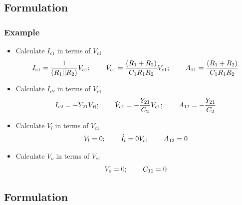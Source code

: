 \documentclass{beamer}
\begin{document}
\subsection*{Formulation}

\begin{frame}
\frametitle{Example}
\begin{small}
\begin{itemize}
\item Calculate $I_{c1}$ in terms of $V_{c1}$\\
\begin{equation}
I_{c1}=\frac{1}{(R_1||R_2)}V_{c1};\hspace{.3in} \dot{V}_{c1}=\frac{(R_1+R_2)}{C_1R_1R_2}V_{c1};\hspace{.3in} A_{11}=\frac{(R_1+R_2)}{C_1R_1R_2}
\end{equation}

\item Calculate $I_{c2}$ in terms of $V_{c1}$\\
\begin{equation}
I_{c2}=-Y_{21}V_{R};\hspace{.3in} \dot{V}_{c1}=-\frac{Y_{21}}{C_2}V_{c1};\hspace{.3in} A_{12}=-\frac{Y_{21}}{C_2}
\end{equation}
\item Calculate $V_{l}$ in terms of $V_{c1}$\\
\begin{equation}
V_{l}=0;\hspace{.3in} \dot{I}_{l}=0V_{c1} \hspace{.3in} A_{13}=0
\end{equation}
\item Calculate $V_{o}$ in terms of $V_{c1}$\\
\begin{equation}
V_o=0; \hspace{0.3in} C_{11}=0
\end{equation}
\end{itemize}
\end{small}
\end{frame}


\subsection*{Formulation}
\end{document}
